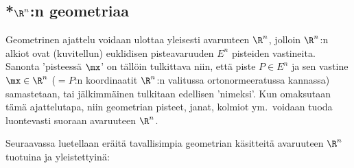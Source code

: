 \subsection*{*$\R^n$:n geometriaa}

Geometrinen ajattelu voidaan ulottaa yleisesti avaruuteen $\R^n$, jolloin $\R^n$:n alkiot ovat
(kuvitellun) euklidisen pisteavaruuden $E^n$ pisteiden vastineita. Sanonta 'pisteessä $\mx$' on
tällöin tulkittava niin, että piste $P \in E^n$ ja sen vastine $\mx \in \R^n$ 
($=P$:n koordinaatit $\R^n$:n valitussa ortonormeeratussa kannassa) samastetaan, tai
jälkimmäinen tulkitaan edellisen 'nimeksi'. Kun omaksutaan tämä ajattelutapa, niin geometrian
pisteet, janat, kolmiot ym.\ voidaan tuoda luontevasti suoraan avaruuteen $\R^n$.

Seuraavassa luetellaan eräitä tavallisimpia geometrian käsitteitä avaruuteen $\R^n$ tuotuina ja
yleistettyinä:
